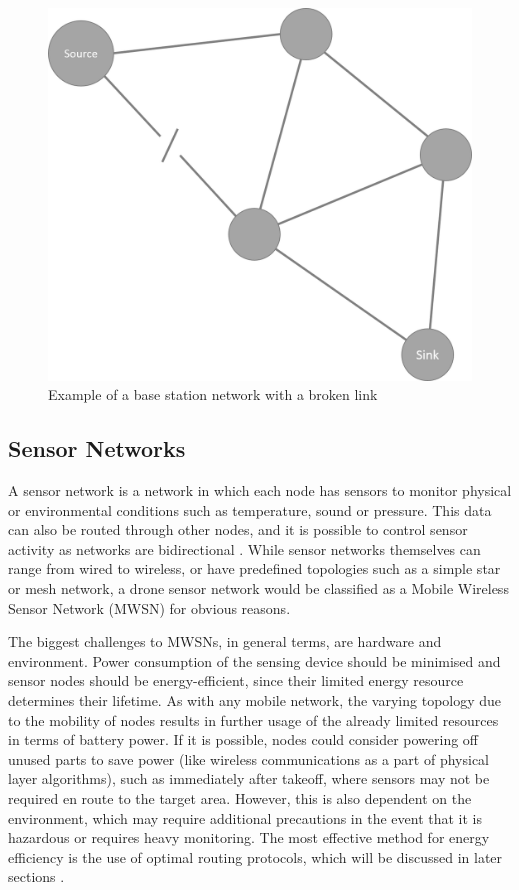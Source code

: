 \begin{figure}
\centering	
\includegraphics[scale=0.3]{img/SensorNetBrokenLink}	
\caption{Example of a base station network with a broken link}
\end{figure}


\subsection{Sensor Networks}
A sensor network is a network in which each node has sensors to monitor physical or environmental conditions such as temperature, sound or pressure. This data can also be routed through other nodes, and it is possible to control sensor activity as networks are bidirectional \cite{kazem2007}. While sensor networks themselves can range from wired to wireless, or have predefined topologies such as a simple star or mesh network, a drone sensor network would be classified as a Mobile Wireless Sensor Network (MWSN) for obvious reasons. 

The biggest challenges to MWSNs, in general terms, are hardware and environment. Power consumption of the sensing device should be minimised and sensor nodes should be energy-efficient, since their limited energy resource determines their lifetime. As with any mobile network, the varying topology due to the mobility of nodes results in further usage of the already limited resources in terms of battery power. If it is possible, nodes could consider powering off unused parts to save power (like wireless communications as a part of physical layer algorithms), such as immediately after takeoff, where sensors may not be required en route to the target area. However, this is also dependent on the environment, which may require additional precautions in the event that it is hazardous or requires heavy monitoring. The most effective method for energy efficiency is the use of optimal routing protocols, which will be discussed in later sections \cite{shiny2012}.

